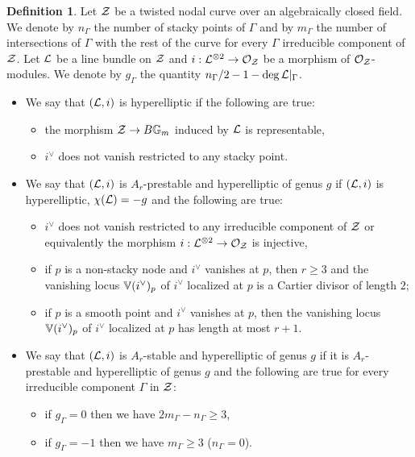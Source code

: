 \documentclass{alggeom}
\numberwithin{equation}{section}
\numberwithin{subsection}{section}
\theoremstyle{definition}
\newtheorem{definition}[theorem]{Definition}
\theoremstyle{remark}
\newcommand\cO{\mathcal{O}} \newcommand\cP{\mathcal{P}}
\newcommand\GG{\mathbb{G}} \newcommand\HH{\mathbb{H}}
\begin{document}
\begin{definition}\label{def:hyp-A_r}
	Let $\mathcal{Z}$ be a twisted nodal curve over an algebraically closed field. We denote by $n_{\Gamma}$ the number of stacky points of $\Gamma$ and by $m_{\Gamma}$ the number of intersections of $\Gamma$ with the rest of the curve for every $\Gamma$ irreducible component of $\mathcal{Z}$. Let $\mathcal{L}$ be a line bundle on $\mathcal{Z}$ and $i:\cL^{\otimes 2} \rightarrow \cO_{\cZ}$ be a morphism of $\cO_{\cZ}$-modules.  We denote by $g_{\Gamma}$ the quantity $n_{\Gamma}/2-1-\deg\mathcal{L}\vert_{\Gamma}$. 
	\begin{itemize}
	\item[(a)] We say that $(\mathcal{L},i)$ is hyperelliptic if the following are true:
			\begin{itemize}
				\item[(a1)] the morphism $\cZ \rightarrow B\GG_m$ induced by $\mathcal{L}$ is representable,
				\item[(a2)] $i^{\vee}$ does not vanish restricted to any stacky point.
			\end{itemize}
	\item[(b)] We say that $(\mathcal{L},i)$ is $A_r$-prestable and hyperelliptic of genus $g$ if $(\mathcal{L},i)$ is hyperelliptic, $\chi(\mathcal{L})=-g$ and the following are true:
		\begin{itemize}
			\item[(b1)] $i^{\vee}$ does not vanish restricted to any irreducible component of $\mathcal{Z}$ or equivalently the morphism $i:\cL^{\otimes 2 }\rightarrow \cO_{\cZ}$ is injective,
			\item[(b2)] if $p$ is a non-stacky node and $i^{\vee}$ vanishes at $p$, then $r\geq 3$ and the vanishing locus $\mathbb{V}(i^{\vee})_p$ of $i^{\vee}$ localized at $p$ is a Cartier divisor of length $2$;
			\item[(b3)] if $p$ is a smooth point and $i^{\vee}$ vanishes at $p$, then the vanishing locus $\mathbb{V}(i^{\vee})_p$ of $i^{\vee}$ localized at $p$ has length at most $r+1$.
		\end{itemize}	
	\item[(c)] We say that $(\mathcal{L},i)$ is $A_r$-stable and hyperelliptic of genus $g$ if it is $A_r$-prestable and hyperelliptic of genus $g$ and the following are true for every irreducible component $\Gamma$ in $\mathcal{Z}$:
			\begin{itemize}
				\item[(c1)] if $g_{\Gamma}=0$ then we have $2m_{\Gamma}-n_{\Gamma}\geq 3$,
				\item[(c2)] if $g_{\Gamma}=-1$ then we have
				$m_{\Gamma}\geq 3$ ($n_{\Gamma}=0$).
			\end{itemize}
\end{itemize}
\end{definition}
\end{document}
